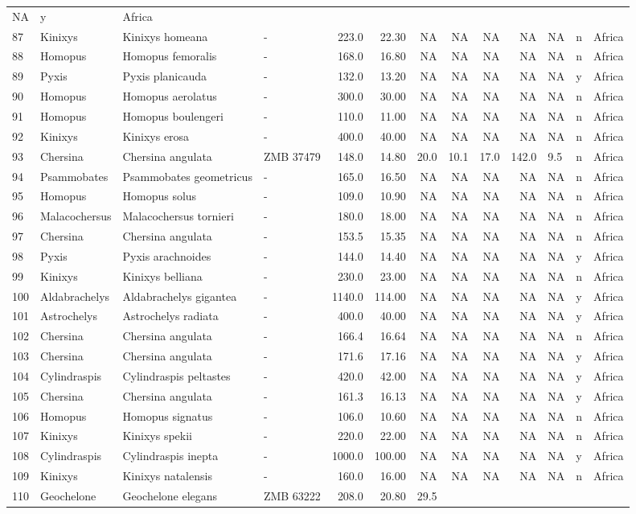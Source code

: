 \documentclass[]{article}
\begin{document}
\begin{longtable}[]{@{}llllrrrrrrlll@{}}
NA & y & Africa\tabularnewline
87 & Kinixys & Kinixys homeana & - & 223.0 & 22.30 & NA & NA & NA & NA &
NA & n & Africa\tabularnewline
88 & Homopus & Homopus femoralis & - & 168.0 & 16.80 & NA & NA & NA & NA
& NA & n & Africa\tabularnewline
89 & Pyxis & Pyxis planicauda & - & 132.0 & 13.20 & NA & NA & NA & NA &
NA & y & Africa\tabularnewline
90 & Homopus & Homopus aerolatus & - & 300.0 & 30.00 & NA & NA & NA & NA
& NA & n & Africa\tabularnewline
91 & Homopus & Homopus boulengeri & - & 110.0 & 11.00 & NA & NA & NA &
NA & NA & n & Africa\tabularnewline
92 & Kinixys & Kinixys erosa & - & 400.0 & 40.00 & NA & NA & NA & NA &
NA & n & Africa\tabularnewline
93 & Chersina & Chersina angulata & ZMB 37479 & 148.0 & 14.80 & 20.0 &
10.1 & 17.0 & 142.0 & 9.5 & n & Africa\tabularnewline
94 & Psammobates & Psammobates geometricus & - & 165.0 & 16.50 & NA & NA
& NA & NA & NA & n & Africa\tabularnewline
95 & Homopus & Homopus solus & - & 109.0 & 10.90 & NA & NA & NA & NA &
NA & n & Africa\tabularnewline
96 & Malacochersus & Malacochersus tornieri & - & 180.0 & 18.00 & NA &
NA & NA & NA & NA & n & Africa\tabularnewline
97 & Chersina & Chersina angulata & - & 153.5 & 15.35 & NA & NA & NA &
NA & NA & n & Africa\tabularnewline
98 & Pyxis & Pyxis arachnoides & - & 144.0 & 14.40 & NA & NA & NA & NA &
NA & y & Africa\tabularnewline
99 & Kinixys & Kinixys belliana & - & 230.0 & 23.00 & NA & NA & NA & NA
& NA & n & Africa\tabularnewline
100 & Aldabrachelys & Aldabrachelys gigantea & - & 1140.0 & 114.00 & NA
& NA & NA & NA & NA & y & Africa\tabularnewline
101 & Astrochelys & Astrochelys radiata & - & 400.0 & 40.00 & NA & NA &
NA & NA & NA & y & Africa\tabularnewline
102 & Chersina & Chersina angulata & - & 166.4 & 16.64 & NA & NA & NA &
NA & NA & n & Africa\tabularnewline
103 & Chersina & Chersina angulata & - & 171.6 & 17.16 & NA & NA & NA &
NA & NA & y & Africa\tabularnewline
104 & Cylindraspis & Cylindraspis peltastes & - & 420.0 & 42.00 & NA &
NA & NA & NA & NA & y & Africa\tabularnewline
105 & Chersina & Chersina angulata & - & 161.3 & 16.13 & NA & NA & NA &
NA & NA & y & Africa\tabularnewline
106 & Homopus & Homopus signatus & - & 106.0 & 10.60 & NA & NA & NA & NA
& NA & n & Africa\tabularnewline
107 & Kinixys & Kinixys spekii & - & 220.0 & 22.00 & NA & NA & NA & NA &
NA & n & Africa\tabularnewline
108 & Cylindraspis & Cylindraspis inepta & - & 1000.0 & 100.00 & NA & NA
& NA & NA & NA & y & Africa\tabularnewline
109 & Kinixys & Kinixys natalensis & - & 160.0 & 16.00 & NA & NA & NA &
NA & NA & n & Africa\tabularnewline
110 & Geochelone & Geochelone elegans & ZMB 63222 & 208.0 & 20.80 & 29.5

\end{longtable}
\end{document}
